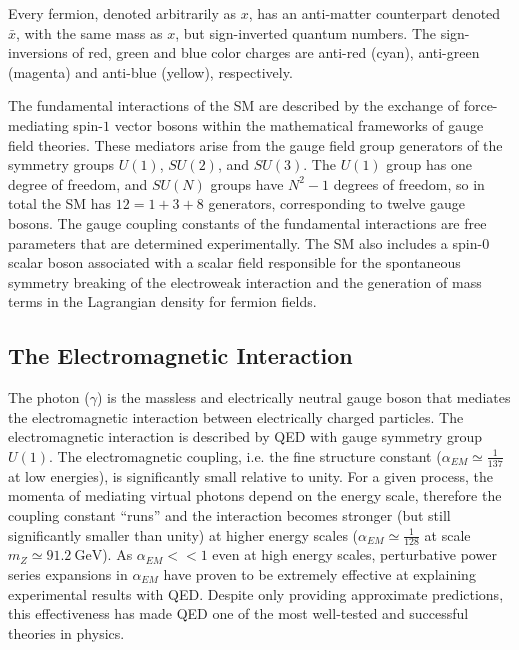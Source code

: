 Every fermion, denoted arbitrarily as $x$, has an anti-matter counterpart denoted $\bar{x}$, with the same mass as $x$, but sign-inverted quantum numbers.
The sign-inversions of red, green and blue color charges are anti-red (cyan), anti-green (magenta) and anti-blue (yellow), respectively.

The fundamental interactions of the SM are described by the exchange of force-mediating spin-$1$ vector bosons within the mathematical frameworks of gauge field theories.
These mediators arise from the gauge field group generators of the symmetry groups $U(1)$, $SU(2)$, and $SU(3)$.
The $U(1)$ group has one degree of freedom, and $SU(N)$ groups have $N^2 - 1$ degrees of freedom, so in total the SM has $12 = 1 + 3 + 8$ generators, corresponding to twelve gauge bosons.
The gauge coupling constants of the fundamental interactions are free parameters that are determined experimentally.
The SM also includes a spin-$0$ scalar boson associated with a scalar field responsible for the spontaneous symmetry breaking of the electroweak interaction and the generation of mass terms in the Lagrangian density for fermion fields.

\subsection{The Electromagnetic Interaction}
The photon ($\gamma$) is the massless and electrically neutral gauge boson that mediates the electromagnetic interaction between electrically charged particles.
The electromagnetic interaction is described by QED with gauge symmetry group $U(1)$.
The electromagnetic coupling, i.e. the fine structure constant ($\alpha_{EM} \simeq \frac{1}{137}$ at low energies), is significantly small relative to unity.
For a given process, the momenta of mediating virtual photons depend on the energy scale, therefore the coupling constant ``runs'' and the interaction becomes stronger (but still significantly smaller than unity) at higher energy scales ($\alpha_{EM} \simeq \frac{1}{128}$ at scale $m_Z \simeq \SI{91.2}{\GeV}$).
As $\alpha_{EM} << 1$ even at high energy scales, perturbative power series expansions in $\alpha_{EM}$ have proven to be extremely effective at explaining experimental results with QED.
Despite only providing approximate predictions, this effectiveness has made QED one of the most well-tested and successful theories in physics.

